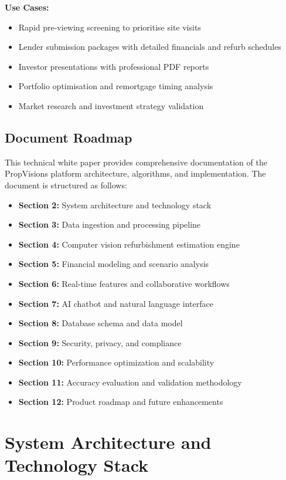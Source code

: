 \documentclass[11pt,a4paper]{article}
\begin{document}
\textbf{Use Cases:}
\begin{itemize}
  \item Rapid pre-viewing screening to prioritise site visits
  \item Lender submission packages with detailed financials and refurb schedules
  \item Investor presentations with professional PDF reports
  \item Portfolio optimisation and remortgage timing analysis
  \item Market research and investment strategy validation
\end{itemize}

\subsection{Document Roadmap}

This technical white paper provides comprehensive documentation of the PropVisions platform architecture, algorithms, and implementation. The document is structured as follows:

\begin{itemize}
  \item \textbf{Section 2:} System architecture and technology stack
  \item \textbf{Section 3:} Data ingestion and processing pipeline
  \item \textbf{Section 4:} Computer vision refurbishment estimation engine
  \item \textbf{Section 5:} Financial modeling and scenario analysis
  \item \textbf{Section 6:} Real-time features and collaborative workflows
  \item \textbf{Section 7:} AI chatbot and natural language interface
  \item \textbf{Section 8:} Database schema and data model
  \item \textbf{Section 9:} Security, privacy, and compliance
  \item \textbf{Section 10:} Performance optimization and scalability
  \item \textbf{Section 11:} Accuracy evaluation and validation methodology
  \item \textbf{Section 12:} Product roadmap and future enhancements
\end{itemize}

\section{System Architecture and Technology Stack}
\end{document}
